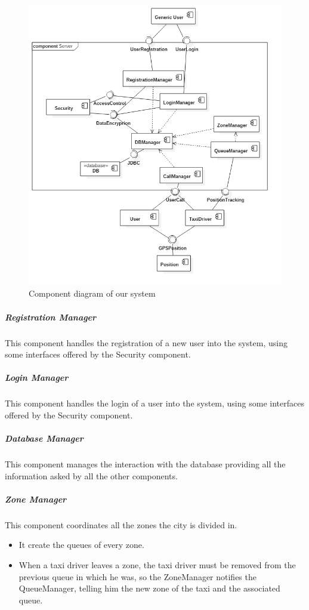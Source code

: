 \begin{figure}[H]
    \centering
    \includegraphics[width=14cm]{./Images/ComponentDiagram.png}
    \caption{Component diagram of our system}
    \label{fig:component-diagram}
\end{figure}


\subparagraph{Registration Manager}
This component handles the registration of a new user into the system, using some interfaces offered by the Security component.

\subparagraph{Login Manager}
This component handles the login of a user into the system, using some interfaces offered by the Security component.

\subparagraph{Database Manager}
This component manages the interaction with the database providing all the information asked by all the other components.

\subparagraph{Zone Manager}
This component coordinates all the zones the city is divided in.
\begin{itemize}
    \item It create the queues of every zone.
    \item When a taxi driver leaves a zone, the taxi driver must be removed from the previous queue in which he was, so the ZoneManager notifies the QueueManager, telling him the new zone of the taxi and the associated queue.
\end{itemize}

